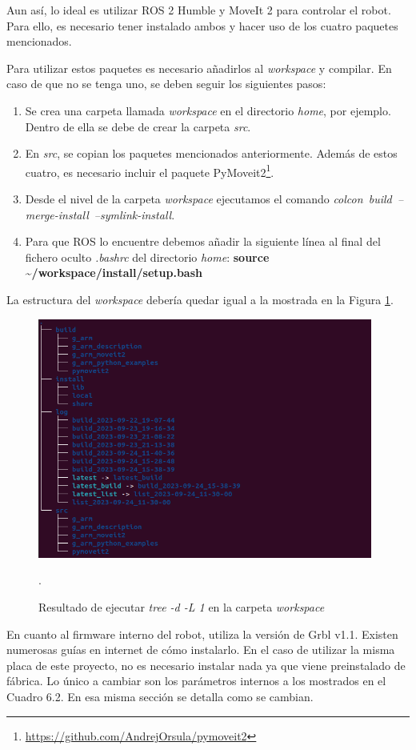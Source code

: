 Aun así, lo ideal es utilizar ROS 2 Humble y MoveIt 2 para controlar el robot. Para ello, es necesario tener instalado 
ambos y hacer uso de los cuatro paquetes mencionados.

\newpage
Para utilizar estos paquetes es necesario añadirlos al \textit{workspace} y compilar. En caso de que no se tenga uno, 
se deben seguir los siguientes pasos: 
\begin{enumerate}
\item Se crea una carpeta llamada \textit{workspace} en el directorio \textit{home}, por ejemplo. Dentro de ella 
se debe de crear la carpeta \textit{src}. 
\item En \textit{src}, se copian los paquetes mencionados anteriormente. Además de estos cuatro, es necesario incluir el paquete 
PyMoveit2\footnote{\url{https://github.com/AndrejOrsula/pymoveit2}}.
\item Desde el nivel de la carpeta \textit{workspace} ejecutamos el comando \mbox{\textit{colcon build --merge-install --symlink-install}}.
\item Para que ROS lo encuentre debemos añadir la siguiente línea al final del fichero oculto \textit{.bashrc} del directorio \textit{home}:
\textbf{source \textasciitilde/workspace/install/setup.bash}

\end{enumerate}

La estructura del \textit{workspace} debería quedar igual a la mostrada en la Figura \ref{fig:ws_tree}.
\begin{figure} [ht!]
    \begin{center}
        \includegraphics[width=11cm]{figs/ws_tree.png}
    \end{center}
    \caption{Resultado de ejecutar \textit{tree -d -L 1} en la carpeta \textit{workspace}}.
\label{fig:ws_tree}
\end{figure}

En cuanto al firmware interno del robot, utiliza la versión de Grbl v1.1. Existen numerosas guías en internet de 
cómo instalarlo. En el caso de utilizar la misma placa de este proyecto, no es necesario instalar nada ya que viene preinstalado de fábrica. Lo único 
a cambiar son los parámetros internos a los mostrados en el Cuadro 6.2. En esa misma sección se detalla como se cambian.

